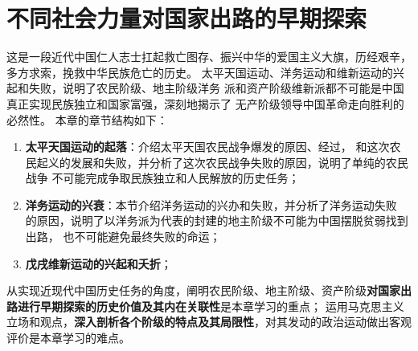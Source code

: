 \documentclass[10pt, UTF8]{book} %
\begin{document}



\clearpage
\thispagestyle{empty}

\chapter{不同社会力量对国家出路的早期探索}
\thispagestyle{empty}

\setcounter{example}{0}
\setcounter{thm}{0}

\quad\quad 这是一段近代中国仁人志士扛起救亡图存、振兴中华的爱国主义大旗，历经艰辛，
多方求索，挽救中华民族危亡的历史。
太平天国运动、洋务运动和维新运动的兴起和失败，说明了农民阶级、地主阶级洋务
派和资产阶级维新派都不可能是中国真正实现民族独立和国家富强，深刻地揭示了
无产阶级领导中国革命走向胜利的必然性。
本章的章节结构如下：
\begin{enumerate}[label=2.\arabic*,itemsep=0pt]
    \item \textbf{太平天国运动的起落}：介绍太平天国农民战争爆发的原因、经过，
    和这次农民起义的发展和失败，并分析了这次农民战争失败的原因，说明了单纯的农民战争
    不可能完成争取民族独立和人民解放的历史任务；
    \item \textbf{洋务运动的兴衰}：本节介绍洋务运动的兴办和失败，并分析了洋务运动失败
    的原因，说明了以洋务派为代表的封建的地主阶级不可能为中国摆脱贫弱找到出路，
    也不可能避免最终失败的命运；
    \item \textbf{戊戌维新运动的兴起和夭折}；
\end{enumerate}

从实现近现代中国历史任务的角度，阐明农民阶级、地主阶级、资产阶级\textbf{对国家出路进行早期探索的历史价值及其内在关联性}是本章学习的重点；
运用马克思主义立场和观点，\textbf{深入剖析各个阶级的特点及其局限性}，对其发动的政治运动做出客观评价是本章学习的难点。
\end{document}
